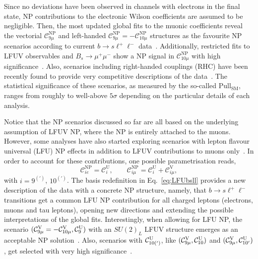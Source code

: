 \documentclass[10pt]{article}
\begin{document}
Since no deviations have been observed in channels with electrons in the final state, NP contributions to the electronic Wilson coefficients are assumed to be negligible. Then, the most updated global fits to the muonic coefficients reveal the vectorial $\mathcal{C}_{9\mu}^\text{NP}$ and left-handed $\mathcal{C}_{9\mu}^\text{NP}=-\mathcal{C}_{10\mu}^\text{NP}$ structures as the favourite NP scenarios according to current $b\to s\ell^+\ell^-$ data~\cite{Altmannshofer:2021qrr,Alguero:2021anc,Hurth:2021nsi,Cornella:2021sby,Geng:2021nhg,Ciuchini:2020gvn}. Additionally, restricted fits to LFUV observables and $B_s\to\mu^+\mu^-$ show a NP signal in  $\mathcal{C}_{10\mu}^\text{NP}$ with high significance~\cite{Altmannshofer:2021qrr,Hurth:2021nsi,Geng:2021nhg}. Also, scenarios including right-handed couplings (RHC) have been recently found to provide very competitive descriptions of the data~\cite{Alguero:2019ptt,Alguero:2021anc}. The statistical significance of these scenarios, as measured by the so-called $\text{Pull}_\text{SM}$, ranges from roughly to well-above $5\sigma$ depending on the particular details of each analysis.

Notice that the NP scenarios discussed so far are all based on the underlying assumption of LFUV NP, where the NP is entirely attached to the muons. However, some analyses have also started exploring scenarios with lepton flavour universal (LFU) NP effects in addition to LFUV contributions to muons only~\cite{Alguero:2018nvb,Aebischer:2019mlg,Alguero:2019ptt,Cornella:2021sby}. In order to account for these contributions, one possible parametrisation reads,
%
\begin{equation}\label{eq:LFUbsll}
\mathcal{C}_{ie}^\text{NP}=\mathcal{C}_i^\text{U}, \qquad \mathcal{C}_{i\mu}^\text{NP}=\mathcal{C}_i^\text{U}+\mathcal{C}_{i\mu}^\text{V},
\end{equation}
%
with $i=9^{(\prime)}$, $10^{(\prime)}$. The basis redefinition in Eq.~\eqref{eq:LFUbsll} provides a new description of the data with a concrete NP structure, namely, that $b\to s\ell^+\ell^-$ transitions get a common LFU NP contribution for all charged leptons (electrons, muons and tau leptons), opening new directions and extending the possible interpretations of the global fits. Interestingly, when allowing for LFU NP, the scenario $(\mathcal{C}_{9\mu}^{\rm V}=-\mathcal{C}_{10\mu}^{\rm V},\mathcal{C}_{9}^{\rm U})$ with an $SU(2)_L$ LFUV structure emerges as an acceptable NP solution~\cite{Alguero:2021anc,Cornella:2021sby}. Also, scenarios with $\mathcal{C}_{10(')}^{\rm U}$, like $(\mathcal{C}_{9\mu}^{\rm V},\mathcal{C}_{10}^{\rm U})$ and $(\mathcal{C}_{9\mu}^{\rm V},\mathcal{C}_{10'}^{\rm U})$, get selected with very high significance~\cite{Alguero:2019ptt,Alguero:2021anc}.
\end{document}
